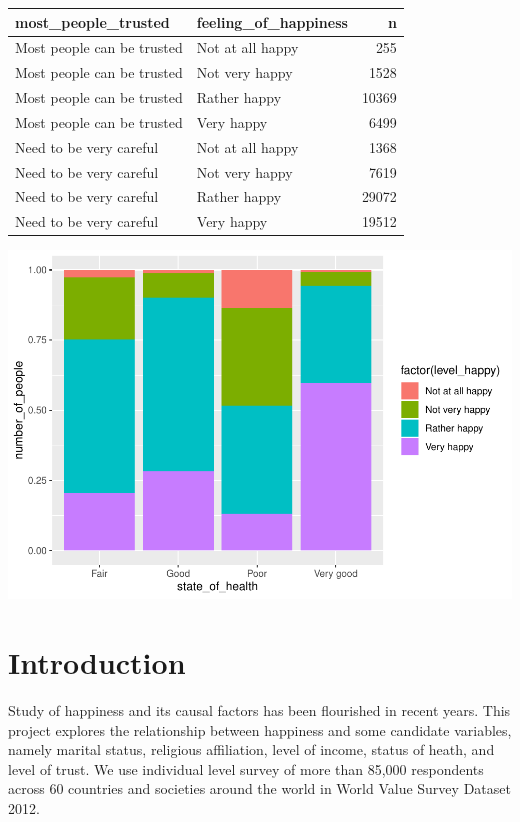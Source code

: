 \documentclass[man,floatsintext]{apa6}
\begin{document}
\begin{tabular}{l|l|r}
\hline
most\_people\_trusted & feeling\_of\_happiness & n\\
\hline
Most people can be trusted & Not at all happy & 255\\
\hline
Most people can be trusted & Not very happy & 1528\\
\hline
Most people can be trusted & Rather happy & 10369\\
\hline
Most people can be trusted & Very happy & 6499\\
\hline
Need to be very careful & Not at all happy & 1368\\
\hline
Need to be very careful & Not very happy & 7619\\
\hline
Need to be very careful & Rather happy & 29072\\
\hline
Need to be very careful & Very happy & 19512\\
\hline
\end{tabular}

\includegraphics{610_final_files/figure-latex/trust and health-2.pdf}

\hypertarget{introduction}{%
\section{Introduction}\label{introduction}}

Study of happiness and its causal factors has been flourished in recent years. This project explores the relationship between happiness and some candidate variables, namely marital status, religious affiliation, level of income, status of heath, and level of trust. We use individual level survey of more than 85,000 respondents across 60 countries and societies around the world in World Value Survey Dataset 2012.
\end{document}
